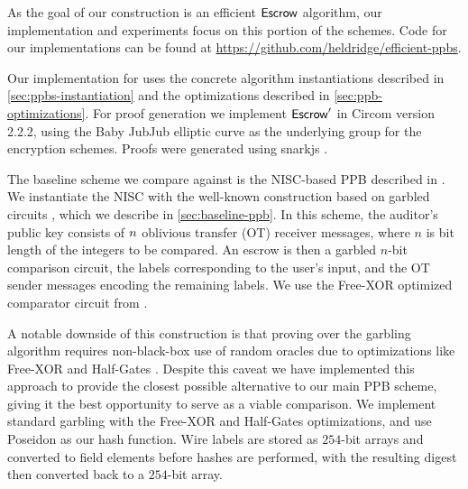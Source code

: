 As the goal of our construction is an efficient ${\sf Escrow}$ algorithm, our implementation and experiments focus on this portion of the schemes.
Code for our implementations can be found at \url{https://github.com/heldridge/efficient-ppbs}.

Our implementation for \schemename{} uses the concrete algorithm instantiations described in \cref{sec:ppbs-instantiation} and the optimizations described in \cref{sec:ppb-optimizations}.
For proof generation we implement ${\sf Escrow}'$ in Circom \cite{belles2022circom} version 2.2.2, using the Baby JubJub elliptic curve \cite{whitehat2020baby} as the underlying group for the encryption schemes.
Proofs were generated using snarkjs \cite{snarkjs}.

The baseline scheme we compare against is the NISC-based PPB described in \cite{EC:KohLysNgu23}.
We instantiate the NISC with the well-known construction based on garbled circuits \cite{FOCS:Yao82b}, which we describe in \cref{sec:baseline-ppb}.
In this scheme, the auditor's public key consists of $n$ oblivious transfer (OT) receiver messages, where $n$ is bit length of the integers to be compared.
An escrow is then a garbled $n$-bit comparison circuit, the labels corresponding to the user's input, and the OT sender messages encoding the remaining labels.
We use the Free-XOR optimized comparator circuit from \cite{CANS:KolSadSch09}.

A notable downside of this construction is that proving over the garbling algorithm requires non-black-box use of random oracles due to optimizations like Free-XOR \cite{CANS:KolSadSch09} and Half-Gates \cite{EC:ZahRosEva15}.
Despite this caveat we have implemented this approach to provide the closest possible alternative to our main PPB scheme, giving it the best opportunity to serve as a viable comparison.
We implement standard garbling with the Free-XOR and Half-Gates optimizations, and use Poseidon \cite{USENIX:GKRRS21} as our hash function.
Wire labels are stored as $254$-bit arrays and converted to field elements before hashes are performed, with the resulting digest then converted back to a $254$-bit array.
